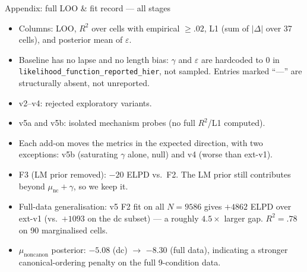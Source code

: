 \documentclass[10pt,aspectratio=169]{beamer}
\begin{document}
\begin{frame}{Appendix: full LOO \& fit record --- all stages}
\vspace{0.6em}
\begin{itemize}\itemsep0.15em
  \item Columns: LOO, $R^2$ over cells with empirical $\geq .02$, L1 (sum of $|\Delta|$ over 37 cells), and posterior mean of $\varepsilon$.
  \item Baseline has no lapse and no length bias: $\gamma$ and $\varepsilon$ are hardcoded to $0$ in \texttt{likelihood\_function\_reported\_hier}, not sampled. Entries marked ``---'' are structurally absent, not unreported.
  \item v2--v4: rejected exploratory variants.
  \item v5a and v5b: isolated mechanism probes (no full $R^2$/L1 computed).
  \item Each add-on moves the metrics in the expected direction, with two exceptions: v5b (saturating $\gamma$ alone, null) and v4 (worse than ext-v1).
  \item F3 (LM prior removed): $-20$ ELPD vs.\ F2. The LM prior still contributes beyond $\mu_\mathrm{nc} + \gamma$, so we keep it.
  \item Full-data generalisation: v5 F2 fit on all $N=9586$ gives $+4862$ ELPD over ext-v1 (vs.\ $+1093$ on the dc subset) --- a roughly $4.5\times$ larger gap. $R^2 = .78$ on 90 marginalised cells.
  \item $\mu_\mathrm{noncanon}$ posterior: $-5.08$ (dc) $\to$ $-8.30$ (full data), indicating a stronger canonical-ordering penalty on the full 9-condition data.
\end{itemize}
\end{frame}
\end{document}

